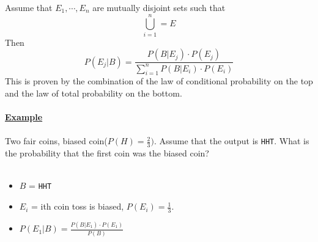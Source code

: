 \documentclass[12pt]{article}
\newcommand{\aside}[1]{\noindent\textbf{\underline{#1}}}
\begin{document}
Assume that $E_1, \cdots, E_n$ are mutually disjoint sets such that \[\bigcup \limits_{i=1}^{n} = E\]Then \[P(E_j | B) = \frac{P(B | E_j) \cdot P(E_j)}{\sum \limits_{i=1}^{n} P(B | E_i) \cdot P(E_i)}\]This is proven by the combination of the law of conditional probability on the top and the law of total probability on the bottom.
\\ \\

\aside{Example}
\\ \\
Two fair coins, biased coin($P(H) = \frac{2}{3})$.  Assume that the output is \texttt{HHT}. What is the probability that the first coin was the biased coin?
\\ \\
\begin{itemize}
\item $B$ = \texttt{HHT}
\item $E_i$ = ith coin toss is biased, $P(E_i) = \frac{1}{3}$.
\item $P(E_1 | B) = \frac{P(B | E_1) \cdot P(E_1)}{P(B)}$

\end{itemize}
\end{document}
